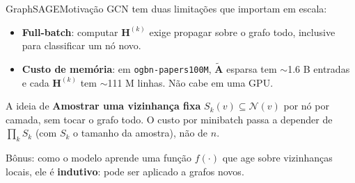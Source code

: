 \documentclass[aspectratio=169,xcolor=dvipsnames]{beamer}
\begin{document}
  \begin{frame}{GraphSAGE}{Motivação}
    GCN tem duas limitações que importam em escala:

    \vspace{0.4em}
    \begin{itemize}
      \item \textbf{Full-batch}: computar $\mathbf{H}^{(k)}$ exige propagar sobre o grafo todo, inclusive para classificar um nó novo.
      \item \textbf{Custo de memória}: em \texttt{ogbn-papers100M}, $\tilde{\mathbf{A}}$ esparsa
            tem $\sim$1.6 B entradas e cada $\mathbf{H}^{(k)}$ tem $\sim$111 M linhas. Não cabe em uma GPU.
    \end{itemize}

    \vspace{0.5em}
    \begin{block}{A ideia de }
      \textbf{Amostrar uma vizinhança fixa}
      $S_k(v) \subseteq \mathcal{N}(v)$ por nó por camada, sem tocar o grafo todo. O custo por minibatch
      passa a depender de $\prod_k S_k$ (com $S_k$ o tamanho da amostra), não de $n$.
    \end{block}

    \vspace{0.4em}
    Bônus: como o modelo aprende uma função $f(\cdot)$ que age sobre vizinhanças
    locais, ele é \textbf{indutivo}: pode ser aplicado a grafos novos.
  \end{frame}
\end{document}
